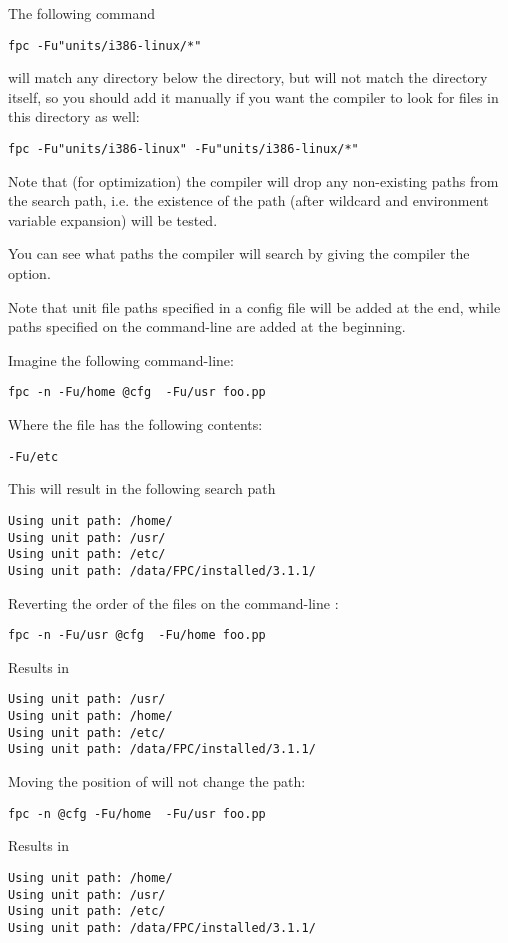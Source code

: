 The following command
\begin{verbatim}
fpc -Fu"units/i386-linux/*"
\end{verbatim}
will match any directory below the  directory,
but will not match the  directory itself, so
you should add it manually if you want the compiler to look for files
in this directory as well:
\begin{verbatim}
fpc -Fu"units/i386-linux" -Fu"units/i386-linux/*"
\end{verbatim}

Note that (for optimization) the compiler will drop any non-existing paths
from the search path, i.e. the existence of the path (after wildcard and
environment variable expansion) will be tested.

You can see what paths the compiler will search by giving the compiler
the  option.

Note that unit file paths specified in a config file will be added at the
end, while paths specified on the command-line are added at the beginning.

Imagine the following command-line:
\begin{verbatim}
fpc -n -Fu/home @cfg  -Fu/usr foo.pp
\end{verbatim}
Where the file  has the following contents:
\begin{verbatim}
-Fu/etc
\end{verbatim}
This will result in the following search path
\begin{verbatim}
Using unit path: /home/
Using unit path: /usr/
Using unit path: /etc/
Using unit path: /data/FPC/installed/3.1.1/
\end{verbatim}
Reverting the order of the files on the command-line :
\begin{verbatim}
fpc -n -Fu/usr @cfg  -Fu/home foo.pp
\end{verbatim}
Results in
\begin{verbatim}
Using unit path: /usr/
Using unit path: /home/
Using unit path: /etc/
Using unit path: /data/FPC/installed/3.1.1/
\end{verbatim}
Moving the position of  will not change the path:
\begin{verbatim}
fpc -n @cfg -Fu/home  -Fu/usr foo.pp
\end{verbatim}
Results in
\begin{verbatim}
Using unit path: /home/
Using unit path: /usr/
Using unit path: /etc/
Using unit path: /data/FPC/installed/3.1.1/
\end{verbatim}

